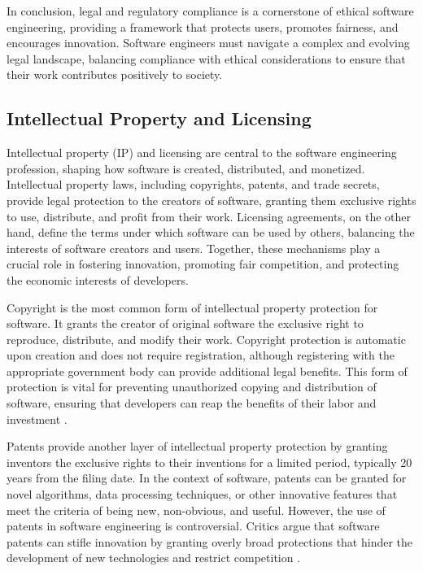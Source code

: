 \begin{refsection}
In conclusion, legal and regulatory compliance is a cornerstone of ethical software engineering, providing a framework that protects users, promotes fairness, and encourages innovation. Software engineers must navigate a complex and evolving legal landscape, balancing compliance with ethical considerations to ensure that their work contributes positively to society.

\subsection{Intellectual Property and Licensing}

Intellectual property (IP) and licensing are central to the software engineering profession, shaping how software is created, distributed, and monetized. Intellectual property laws, including copyrights, patents, and trade secrets, provide legal protection to the creators of software, granting them exclusive rights to use, distribute, and profit from their work. Licensing agreements, on the other hand, define the terms under which software can be used by others, balancing the interests of software creators and users. Together, these mechanisms play a crucial role in fostering innovation, promoting fair competition, and protecting the economic interests of developers.

Copyright is the most common form of intellectual property protection for software. It grants the creator of original software the exclusive right to reproduce, distribute, and modify their work. Copyright protection is automatic upon creation and does not require registration, although registering with the appropriate government body can provide additional legal benefits. This form of protection is vital for preventing unauthorized copying and distribution of software, ensuring that developers can reap the benefits of their labor and investment \cite[pp.~15-18]{fishman2017legal}.

Patents provide another layer of intellectual property protection by granting inventors the exclusive rights to their inventions for a limited period, typically 20 years from the filing date. In the context of software, patents can be granted for novel algorithms, data processing techniques, or other innovative features that meet the criteria of being new, non-obvious, and useful. However, the use of patents in software engineering is controversial. Critics argue that software patents can stifle innovation by granting overly broad protections that hinder the development of new technologies and restrict competition \cite[pp.~113-115]{bessen2008patent}.


\end{refsection}
